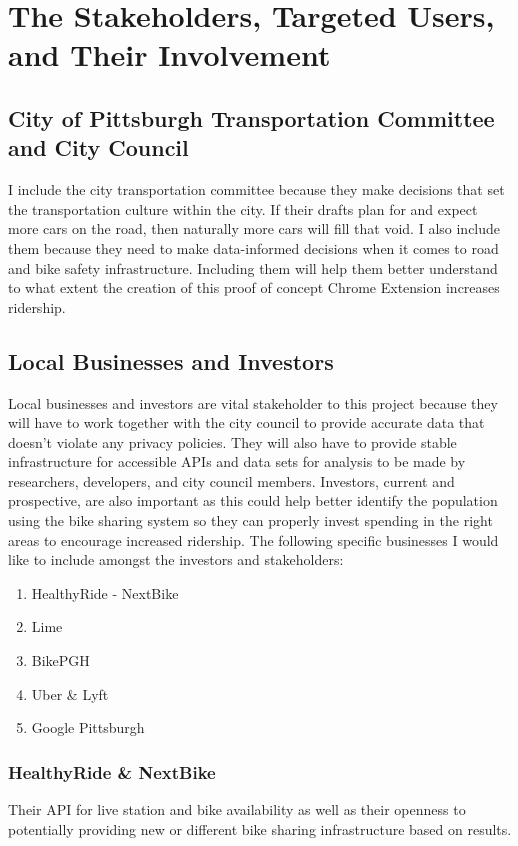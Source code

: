 \documentclass[letterpaper, 12 pt, conference]{ieeeconf}  %
\begin{document}
\section{The Stakeholders, Targeted Users, and Their Involvement}
\subsection{City of Pittsburgh Transportation Committee and City Council}
 I include the city transportation committee because they make decisions that set the transportation culture within the city. If their drafts plan for and expect more cars on the road, then naturally more cars will fill that void. I also include them because they need to make data-informed decisions when it comes to road and bike safety infrastructure. Including them will help them better understand to what extent the creation of this proof of concept Chrome Extension increases ridership. 

\subsection{Local Businesses and Investors}
Local businesses and investors are vital stakeholder to this project because they will have to work together with the city council to provide accurate data that doesn't violate any privacy policies. They will also have to provide stable infrastructure for accessible APIs and data sets for analysis to be made by researchers, developers, and city council members. Investors, current and prospective, are also important as this could help better identify the population using the bike sharing system so they can properly invest spending in the right areas to encourage increased ridership. The following specific businesses I would like to include amongst the investors and stakeholders:
\begin{enumerate}
\item HealthyRide - NextBike
\item Lime
\item BikePGH
\item Uber \& Lyft
\item Google Pittsburgh
\end{enumerate}

\subsubsection{HealthyRide \& NextBike}
Their API for live station and bike availability as well as their openness to potentially providing new or different bike sharing infrastructure based on results.
\end{document}
